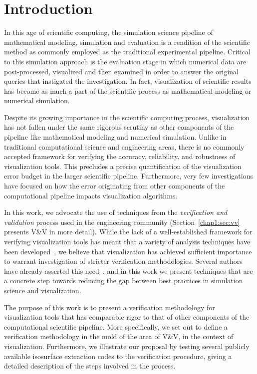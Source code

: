 \section{Introduction}
\label{chap1:sec:intro}

In this age of scientific computing, 
the simulation science pipeline of mathematical
modeling, simulation and evaluation is
a rendition of the scientific method as commonly employed as
the traditional experimental pipeline.
Critical to this simulation approach is
the evaluation stage in which numerical
data are post-processed, visualized and 
then examined in order to answer the original
queries that instigated the investigation.
In fact, visualization of scientific results has become
as much a part of the scientific process as 
mathematical modeling or numerical simulation.  

Despite its growing importance in the
scientific computing process, visualization has not fallen under the same
rigorous scrutiny as other components of the pipeline
like mathematical modeling and numerical simulation.
Unlike in traditional computational science and engineering areas,
there is no commonly accepted framework for verifying the accuracy, reliability, 
and robustness of visualization tools. This precludes
a precise quantification of the visualization error budget in the 
larger scientific pipeline.
Furthermore, very few investigations have focused on how the error originating from 
other components of the computational pipeline
impacts visualization algorithms. %

In this work, we advocate the use of techniques from the
\emph{verification and validation} process used in the engineering
community (Section~\ref{chap1:sec:vv} presents V\&V in more detail). While
the lack of a well-established framework for verifying visualization
tools has meant that a variety of analysis techniques have been
developed~\cite{zhou01,tory04}, we believe that visualization 
has achieved sufficient importance to warrant investigation of
stricter verification methodologies. Several authors have
already asserted this need~\cite{globus95,kirby-vv-08}, and in this work we
present techniques that are a concrete step towards reducing the
gap between best practices in simulation science and visualization.


The purpose of this work is to present a verification methodology
for visualization tools that has comparable rigor to that of other 
components of the computational scientific pipeline. More specifically, we set out
to define a verification methodology in the mold of the area of V\&V, 
in the context of visualization.
Furthermore, we illustrate our proposal by testing several publicly 
available isosurface extraction
codes to the verification procedure, giving a detailed 
description of the steps involved in the process.

